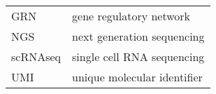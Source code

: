 
\begin{tabular}{@{}ll@{}}
  GRN & gene regulatory network \\
  NGS & next generation sequencing \\
  scRNAseq & single cell RNA sequencing \\
  UMI & unique molecular identifier \\
\end{tabular}

